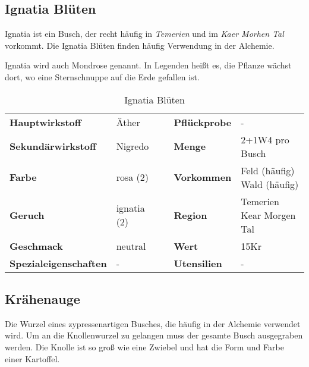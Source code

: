 \subsection{Ignatia Blüten}
Ignatia ist ein Busch, der recht häufig in \textit{Temerien} und im \textit{Kaer Morhen Tal} vorkommt. Die Ignatia Blüten finden häufig Verwendung in der Alchemie.

Ignatia wird auch Mondrose genannt. In Legenden heißt es, die Pflanze wächst dort, wo eine Sternschnuppe auf die Erde gefallen ist.

\begin{table}[H] 
\begin{center} 
\begin{tabular}{|l|l|p{1cm}|l|l|} 
  	\cline{1-2} \cline{4-5} 
  	\textbf{Hauptwirkstoff} & Äther && \textbf{Pflückprobe} & - \\ \cline{1-2} \cline{4-5} 
  	\textbf{Sekundärwirkstoff} & Nigredo && \textbf{Menge} & 2+1W4 pro Busch \\ \cline{1-2} \cline{4-5} 
  	\textbf{Farbe} & rosa (2) && \textbf{Vorkommen} & \brcell{Feld (häufig) \\ Wald (häufig)} \\ \cline{1-2} \cline{4-5} 
  	\textbf{Geruch} & ignatia (2) && \textbf{Region} & \brcell{Temerien \\ Kear Morgen Tal} \\ \cline{1-2} \cline{4-5} 
  	\textbf{Geschmack} & neutral && \textbf{Wert} & 15Kr \\ \cline{1-2} \cline{4-5} 
  	\textbf{Spezialeigenschaften} & - && \textbf{Utensilien} & - \\ \cline{1-2} \cline{4-5} 
\end{tabular} 
\end{center} 
\caption{Ignatia Blüten} 
\label{tab:ignatia_blueten} 
\end{table}

\subsection{Krähenauge}
Die Wurzel eines zypressenartigen Busches, die häufig in der Alchemie verwendet wird. Um an die Knollenwurzel zu gelangen muss der gesamte Busch ausgegraben werden. Die Knolle ist so groß wie eine Zwiebel und hat die Form und Farbe einer Kartoffel.

